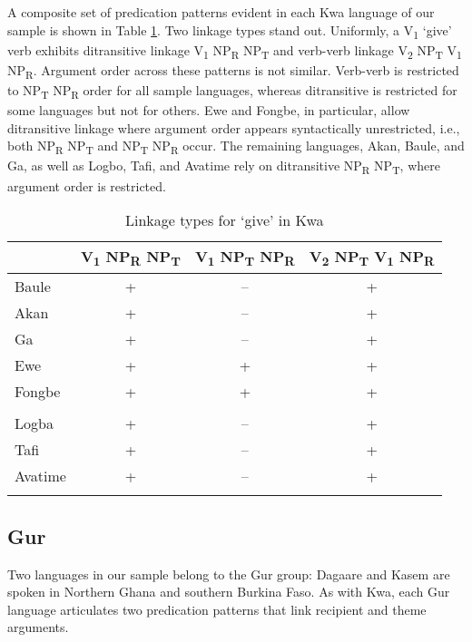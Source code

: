 \documentclass[output=paper,colorlinks,citecolor=brown]{langscibook}
\begin{document}
A composite set of predication patterns evident in each Kwa language of our sample is shown in Table \ref{tab:LinkageKwa}. Two linkage types stand out. Uniformly, a V\textsubscript{1} ‘give’ verb exhibits ditransitive linkage V\textsubscript{1} NP\textsubscript{R} NP\textsubscript{T} and verb-verb linkage V\textsubscript{2} NP\textsubscript{T} V\textsubscript{1} NP\textsubscript{R}. Argument order  across these patterns is not similar. Verb-verb is restricted to NP\textsubscript{T} NP\textsubscript{R} order for all sample languages, whereas ditransitive is restricted for some languages but not for others. Ewe and Fongbe, in particular, allow ditransitive linkage where argument order appears syntactically unrestricted, i.e., both NP\textsubscript{R} NP\textsubscript{T} and NP\textsubscript{T} NP\textsubscript{R} occur. The remaining languages, Akan, Baule, and Ga, as well as Logbo, Tafi, and Avatime rely on ditransitive NP\textsubscript{R} NP\textsubscript{T}, where argument order is restricted.

\begin{table}
\caption{Linkage types for ‘give’ in Kwa}
\label{tab:LinkageKwa}
 \begin{tabular}{lccc}
  \lsptoprule
 &  V\textsubscript{1} NP\textsubscript{R} NP\textsubscript{T}	&V\textsubscript{1} NP\textsubscript{T} NP\textsubscript{R} &	V\textsubscript{2} NP\textsubscript{T} V\textsubscript{1} NP\textsubscript{R}  \\
  \midrule
Baule &	+ &	--	&+\\
Akan&	+&--	&+\\
Ga	&+&	--&	+\\
Ewe&	+&	+&	+\\
Fongbe&	+&	+&	+\\
	&&&		\\
Logba&	+	&--&	+\\
Tafi	&+&	--&	+\\
Avatime&	+&	--&	+\\
  \lspbottomrule
 \end{tabular}
\end{table}

\subsection{Gur}

Two languages in our sample belong to the Gur group: Dagaare and Kasem are spoken in Northern Ghana and southern Burkina Faso. As with Kwa, each Gur language articulates two predication patterns that link recipient and theme arguments.
\end{document}
